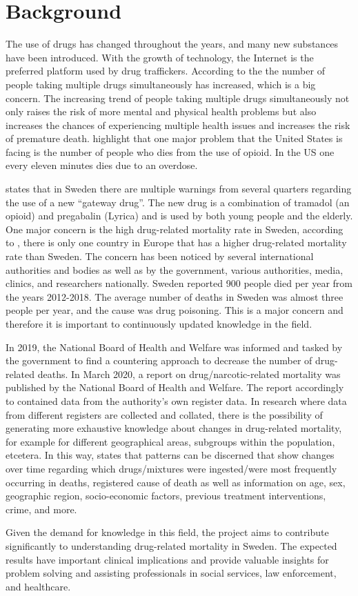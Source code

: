 \section{Background}
The use of drugs has changed throughout the years, and many new substances have been introduced. With the growth of technology, the Internet is the preferred platform used by drug traffickers. According to the \cite{medData} the number of people taking multiple drugs simultaneously has increased, which is a big concern. The increasing trend of people taking multiple drugs simultaneously not only raises the risk of more mental and physical health problems but also increases the chances of experiencing multiple health issues and increases the risk of premature death. \cite{medData} highlight that one major problem that the United States is facing is the number of people who dies from the use of opioid. In the US one every eleven minutes dies due to an overdose. 

\cite{medData} states that in Sweden there are multiple warnings from several quarters regarding the use of a new “gateway drug”. The new drug is a combination of tramadol (an opioid) and pregabalin (Lyrica) and is used by both young people and the elderly. One major concern is the high drug-related mortality rate in Sweden, according to \cite{medData}, there is only one country in Europe that has a higher drug-related mortality rate than Sweden. The concern has been noticed by several international authorities and bodies as well as by the government, various authorities, media, clinics, and researchers nationally. Sweden reported 900 people died per year from the years 2012-2018. The average number of deaths in Sweden was almost three people per year, and the cause was drug poisoning. This is a major concern and therefore it is important to continuously updated knowledge in the field.

In 2019, the National Board of Health and Welfare was informed and tasked by the government to find a countering approach to decrease the number of drug-related deaths. In March 2020, a report on drug/narcotic-related mortality was published by the National Board of Health and Welfare. The report accordingly to \cite{medData} contained data from the authority's own register data. In research where data from different registers are collected and collated, there is the possibility of generating more exhaustive knowledge about changes in drug-related mortality, for example for different geographical areas, subgroups within the population, etcetera. In this way, \cite{medData} states that patterns can be discerned that show changes over time regarding which drugs/mixtures were ingested/were most frequently occurring in deaths, registered cause of death as well as information on age, sex, geographic region, socio-economic factors, previous treatment interventions, crime, and more.

Given the demand for knowledge in this field, the project aims to contribute significantly to understanding drug-related mortality in Sweden. The expected results have important clinical implications and provide valuable insights for problem solving and assisting professionals in social services, law enforcement, and healthcare.